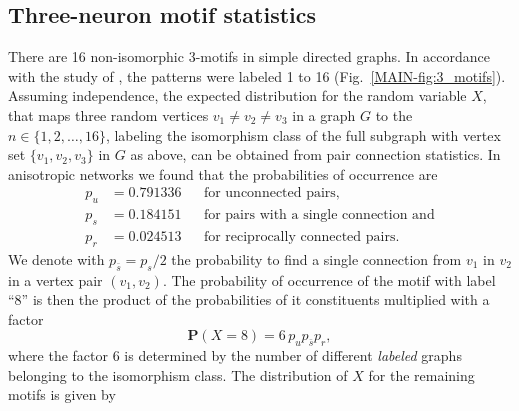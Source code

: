 \subsection{Three-neuron motif statistics}
\label{sec:3motif_stat}

There are 16 %
non-isomorphic 3-motifs %
in simple directed graphs. In accordance with the study of
\textcite{Song2005}, the patterns were labeled 1 to 16
(Fig.~\ref{MAIN-fig:3_motifs}). Assuming independence, the expected
distribution for the random variable $X$, that maps three random
vertices $v_1 \neq v_2 \neq v_3$ in a graph $G$ to the
$n \in \{1,2,\dots,16\}$, labeling the isomorphism class of the full
subgraph with vertex set $\{v_1,v_2,v_3\}$ in $G$ as above, can be
obtained from pair connection statistics. In anisotropic networks we
found that the probabilities of occurrence are
\begin{align*} 
  p_u & = 0.791336     &&\text{for unconnected pairs,}     \\
  p_s & = 0.184151     &&\text{for pairs with a single connection and} \\
  p_r & = 0.024513     &&\text{for reciprocally connected pairs.}
\end{align*}
We denote with $p_{\bar{s}} = p_s/2$ the probability to find a single
connection from $v_1$ in $v_2$ in a vertex pair $(v_1,v_2)$. The
probability of occurrence of the motif with label \enquote{8} is then
the product of the probabilities of it constituents multiplied with a
factor
\[
  \mathbf{P}(X=8) = 6\, p_{u} p_{\bar{s}} p_{r},
\]
where the factor 6 is determined by the number of different
\textit{labeled} graphs belonging to the isomorphism class. The
distribution of $X$ for the remaining motifs is given by \\
%
\smallskip
%
